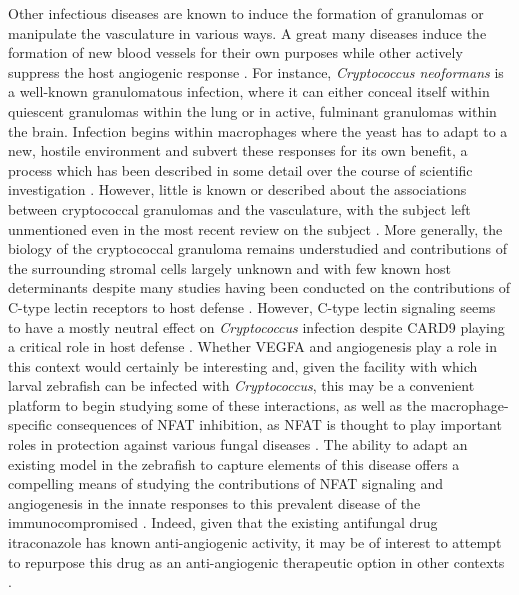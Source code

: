 Other infectious diseases are known to induce the formation of granulomas or manipulate the vasculature in various ways. A great many diseases induce the formation of new blood vessels for their own purposes while other actively suppress the host angiogenic response \citep{Osherov2016}. For instance, \textit{Cryptococcus neoformans} is a well\hyp{}known granulomatous infection, where it can either conceal itself within quiescent granulomas within the lung or in active, fulminant granulomas within the brain. Infection begins within macrophages where the yeast has to adapt to a new, hostile environment and subvert these responses for its own benefit, a process which has been described in some detail over the course of scientific investigation \citep{Coelho2014}. However, little is known or described about the associations between cryptococcal granulomas and the vasculature, with the subject left unmentioned even in the most recent review on the subject \citep{Ristow2021}. More generally, the biology of the cryptococcal granuloma remains understudied and contributions of the surrounding stromal cells largely unknown and with few known host determinants despite many studies having been conducted on the contributions of C\hyp{}type lectin receptors to host defense \citep{Campuzano2017}. However, C\hyp{}type lectin signaling seems to have a mostly neutral effect on \textit{Cryptococcus} infection despite CARD9 playing a critical role in host defense \citep{Nakamura2007, Campuzano2017, Walsh2017}. Whether VEGFA and angiogenesis play a role in this context would certainly be interesting and, given the facility with which larval zebrafish can be infected with \textit{Cryptococcus}, this may be a convenient platform to begin studying some of these interactions, as well as the macrophage\hyp{}specific consequences of NFAT inhibition, as NFAT is thought to play important roles in protection against various fungal diseases \citep{Tenor2015, Davis2016, Greenblatt2010, Goodridge2007, Bojarczuk2016}. The ability to adapt an existing model in the zebrafish to capture elements of this disease offers a compelling means of studying the contributions of NFAT signaling and angiogenesis in the innate responses to this prevalent disease of the immunocompromised \citep{Lin2006b}. Indeed, given that the existing antifungal drug itraconazole has known anti\hyp{}angiogenic activity, it may be of interest to attempt to repurpose this drug as an anti\hyp{}angiogenic therapeutic option in other contexts \citep{Nacev2011}.


